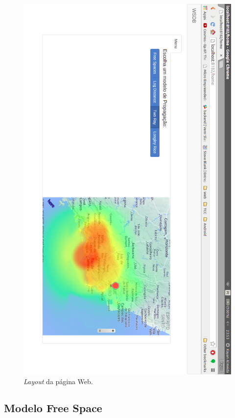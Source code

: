 \begin{figure}[H]
\centering
\includegraphics[width=1\textwidth]{figs/paginaweb}
\caption[\textit{Layout} da página Web.]
{\textit{Layout} da página Web.}
\label{fig:paginaweb}
\end{figure}

\FloatBarrier

\subsection{Modelo Free Space}

